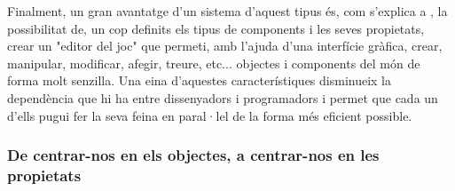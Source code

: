 Finalment, un gran avantatge d'un sistema d'aquest tipus és, com s'explica a \cite{Leonard99}, la possibilitat de, un cop definits els tipus de components i les seves propietats, crear un "editor del joc" que permeti, amb l'ajuda d'una interfície gràfica, crear, manipular, modificar, afegir, treure, etc... objectes i components del món de forma molt senzilla. Una eina d'aquestes característiques disminueix la dependència que hi ha entre dissenyadors i programadors i permet que cada un d'ells pugui fer la seva feina en paral·lel de la forma més eficient possible.

\subsubsection{De centrar-nos en els objectes, a centrar-nos en les propietats}